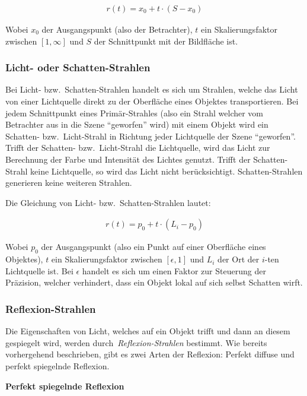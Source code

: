 \begin{gather}
    r(t) = x_{0} + t \cdot (S - x_{0})
\end{gather}

Wobei $x_{0}$ der Ausgangspunkt (also der Betrachter), $t$ ein
Skalierungsfaktor zwischen $[1, \infty]$ und $S$ der Schnittpunkt mit der
Bildfläche ist.

\subsubsection{Licht- oder Schatten-Strahlen}
\label{ssubsec:ray_tracing:shadow_rays}
Bei Licht- bzw.\ Schatten-Strahlen handelt es sich um Strahlen, welche
das Licht von einer Lichtquelle direkt zu der Oberfläche eines
Objektes transportieren. Bei jedem Schnittpunkt eines Primär-Strahles
(also ein Strahl welcher vom Betrachter aus in die Szene ``geworfen''
wird) mit einem Objekt wird ein Schatten- bzw.\ Licht-Strahl in Richtung jeder
Lichtquelle der Szene ``geworfen''. Trifft der Schatten- bzw.\
Licht-Strahl die Lichtquelle, wird das Licht zur Berechnung der Farbe
und Intensität des Lichtes genutzt. Trifft der Schatten-Strahl keine
Lichtquelle, so wird das Licht nicht berücksichtigt. Schatten-Strahlen
generieren keine weiteren Strahlen.

Die Gleichung von Licht- bzw.\ Schatten-Strahlen lautet:

\begin{gather}
    r(t) = p_{0} + t \cdot (L_{i} - p_{0})
\end{gather}

Wobei $p_{0}$ der Ausgangspunkt (also ein Punkt auf einer Oberfläche
eines Objektes), $t$ ein Skalierungsfaktor zwischen $[\epsilon, 1]$ und
$L_{i}$ der Ort der $i$-ten Lichtquelle ist. Bei $\epsilon$ handelt es
sich um einen Faktor zur Steuerung der Präzision, welcher verhindert,
dass ein Objekt lokal auf sich selbst Schatten wirft.


\subsubsection{Reflexion-Strahlen}
\label{ssubsec:ray_tracing:reflection_rays}

Die Eigenschaften von Licht, welches auf ein Objekt trifft und dann an
diesem gespiegelt wird, werden durch~\textit{Reflexion-Strahlen}
bestimmt. Wie bereits vorhergehend beschrieben, gibt es zwei Arten der
Reflexion: Perfekt diffuse und perfekt spiegelnde Reflexion.

\textbf{Perfekt spiegelnde Reflexion}

